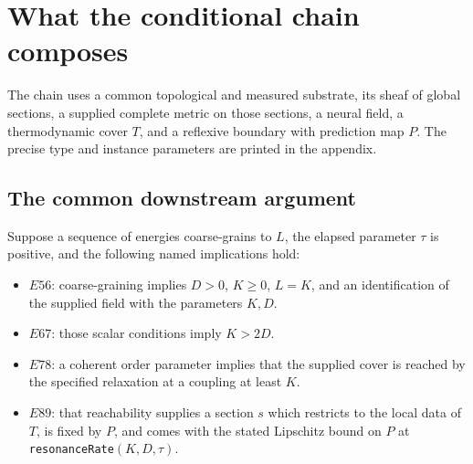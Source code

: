 \section{What the conditional chain composes}
The chain uses a common topological and measured substrate, its sheaf of
global sections, a supplied complete metric on those sections, a neural field,
a thermodynamic cover $T$, and a reflexive boundary with prediction map $P$.
The precise type and instance parameters are printed in the appendix.

\subsection{The common downstream argument}
Suppose a sequence of energies coarse-grains to $L$, the elapsed parameter
$\tau$ is positive, and the following named implications hold:
\begin{itemize}
\item $E56$: coarse-graining implies $D>0$, $K\geq0$, $L=K$, and an
identification of the supplied field with the parameters $K,D$.
\item $E67$: those scalar conditions imply $K>2D$.
\item $E78$: a coherent order parameter implies that the supplied cover is
reached by the specified relaxation at a coupling at least $K$.
\item $E89$: that reachability supplies a section $s$ which restricts to the
local data of $T$, is fixed by $P$, and comes with the stated Lipschitz bound
on $P$ at \texttt{resonanceRate}$(K,D,\tau)$.
\end{itemize}

